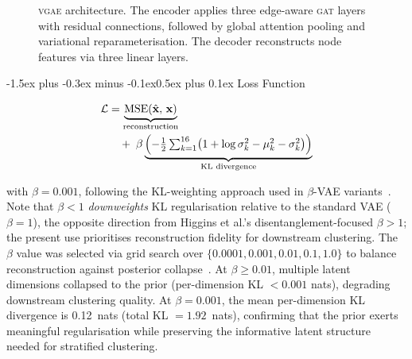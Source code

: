 \documentclass[10pt,a4paper,twocolumn]{article}
\makeatletter
\newcommand{\vgae}{\textsc{vgae}}
\newcommand{\gat}{\textsc{gat}}
\renewcommand\subsubsection{\@startsection{subsubsection}{3}{\z@}%
  {-1.5ex plus -0.3ex minus -0.1ex}{0.5ex plus 0.1ex}%
  {\normalfont\normalsize\bfseries}}
\makeatother
\begin{document}
\begin{figure}[tbp]
\caption{\vgae{} architecture. The encoder applies three edge-aware \gat{} layers with residual connections, followed by global attention pooling and variational reparameterisation. The decoder reconstructs node features via three linear layers.}
\label{fig:architecture}
\end{figure}

\subsubsection{Loss Function}

\begin{equation}
\begin{split}
    \mathcal{L} &= \underbrace{\mathrm{MSE}(\hat{\mathbf{x}},\, \mathbf{x})}_{\text{reconstruction}} \\
    &\quad + \;\beta \underbrace{\Bigl(-\tfrac{1}{2}\textstyle\sum_{k=1}^{16}
      \bigl(1 + \log\sigma_k^2 - \mu_k^2 - \sigma_k^2\bigr)\Bigr)}_{\text{KL divergence}}
\end{split}
\label{eq:loss}
\end{equation}

with $\beta = 0.001$, following the KL-weighting approach used in $\beta$-VAE variants~\cite{higgins2017}. Note that $\beta < 1$ \emph{downweights} KL regularisation relative to the standard VAE ($\beta = 1$), the opposite direction from Higgins et al.'s disentanglement-focused $\beta > 1$; the present use prioritises reconstruction fidelity for downstream clustering. The $\beta$ value was selected via grid search over $\{0.0001, 0.001, 0.01, 0.1, 1.0\}$ to balance reconstruction against posterior collapse~\cite{bowman2016}. At $\beta \geq 0.01$, multiple latent dimensions collapsed to the prior (per-dimension KL $< 0.001$ nats), degrading downstream clustering quality. At $\beta = 0.001$, the mean per-dimension KL divergence is 0.12~nats (total KL $= 1.92$~nats), confirming that the prior exerts meaningful regularisation while preserving the informative latent structure needed for stratified clustering.
\end{document}

